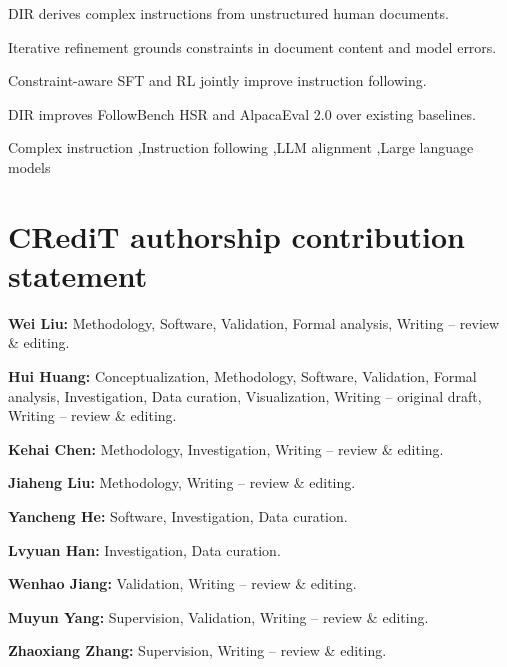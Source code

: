 \documentclass[a4paper,fleqn]{cas-dc}
\begin{document}
\begin{highlights}
\item DIR derives complex instructions from unstructured human documents.
\item Iterative refinement grounds constraints in document content and model errors.
\item Constraint-aware SFT and RL jointly improve instruction following.
\item DIR improves FollowBench HSR and AlpacaEval 2.0 over existing baselines.
\end{highlights}

\begin{keywords}
Complex instruction \sep Instruction following \sep LLM alignment \sep Large language models
\end{keywords}

\maketitle










\section*{CRediT authorship contribution statement}
\textbf{Wei Liu:} Methodology, Software, Validation, Formal analysis, Writing -- review \& editing.

\textbf{Hui Huang:} Conceptualization, Methodology, Software, Validation, Formal analysis, Investigation, Data curation, Visualization, Writing -- original draft, Writing -- review \& editing.

\textbf{Kehai Chen:} Methodology, Investigation, Writing -- review \& editing.

\textbf{Jiaheng Liu:} Methodology, Writing -- review \& editing.

\textbf{Yancheng He:} Software, Investigation, Data curation.

\textbf{Lvyuan Han:} Investigation, Data curation.

\textbf{Wenhao Jiang:} Validation, Writing -- review \& editing.

\textbf{Muyun Yang:} Supervision, Validation, Writing -- review \& editing.

\textbf{Zhaoxiang Zhang:} Supervision, Writing -- review \& editing.
\end{document}
